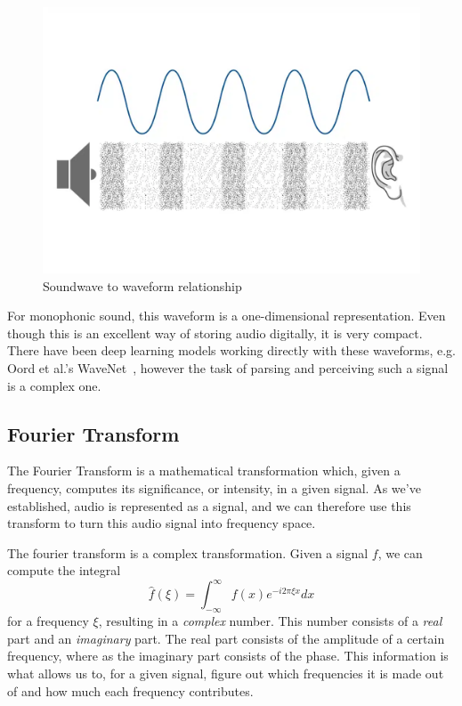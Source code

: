 \begin{figure}[H]
    \centering
    \includegraphics[scale=0.3]{figures/waveform}
    \caption{Soundwave to waveform relationship}
    \label{WaveformFigure}
\end{figure}

For monophonic sound, this waveform is a one-dimensional representation. Even though this is an excellent way of storing audio digitally, it is very compact. There have been deep learning models working directly with these waveforms, e.g. Oord et al.'s WaveNet~\cite{oord2016wavenetgenerativemodelraw}, however the task of parsing and perceiving such a signal is a complex one.

\subsection{Fourier Transform}

The Fourier Transform is a mathematical transformation which, given a frequency, computes its significance, or intensity, in a given signal. As we've established, audio is represented as a signal, and we can therefore use this transform to turn this audio signal into frequency space. 

The fourier transform is a complex transformation. Given a signal $f$, we can compute the integral $$ \widehat{f}(\xi) = \int^{\infty}_{-\infty}{f(x)e^{-i2\pi \xi x} dx} $$ for a frequency $\xi$, resulting in a \textit{complex} number. This number consists of a \textit{real} part and an \textit{imaginary} part. The real part consists of the amplitude of a certain frequency, where as the imaginary part consists of the phase. This information is what allows us to, for a given signal, figure out which frequencies it is made out of and how much each frequency contributes.

